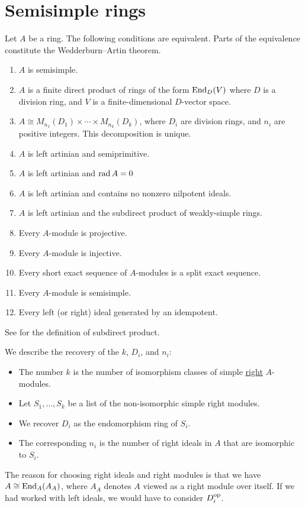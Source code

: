 \documentclass[12pt]{article}
\begin{document}
\section{Semisimple rings}

\begin{thm} \label{thm:semisimple-ring-equivalences}
	Let $A$ be a ring. The following conditions are equivalent. Parts of the equivalence constitute the Wedderburn--Artin theorem.
	\begin{enumerate}[label=(\alph*)]
		\item $A$ is semisimple.
		\item $A$ is a finite direct product of rings of the form $\operatorname{End}_{D}(V)$ where $D$ is a division ring, and $V$ is a finite-dimensional $D$-vector space.
		\item $A \cong M_{n_{1}}(D_{1}) \times \cdots \times M_{n_{k}}(D_{k})$, where $D_{i}$ are division rings, and $n_{i}$ are positive integers. \newline
		This decomposition is unique.
		\item $A$ is left artinian and semiprimitive.
		\item $A$ is left artinian and $\operatorname{rad} A = 0$
		\item $A$ is left artinian and contains no nonzero nilpotent ideals.
		\item $A$ is left artinian and the subdirect product of weakly-simple rings.
		\item Every $A$-module is projective.
		\item Every $A$-module is injective.
		\item Every short exact sequence of $A$-modules is a split exact sequence.
		\item Every $A$-module is semisimple.
		\item Every left (or right) ideal generated by an idempotent.
	\end{enumerate}
\end{thm}
See  for the definition of subdirect product.

\begin{rem}
	We describe the recovery of the $k$, $D_{i}$, and $n_{i}$: 
	\begin{itemize}
		\item The number $k$ is the number of isomorphism classes of simple \underline{right} $A$-modules.
		\item Let $S_{1}, \ldots, S_{k}$ be a list of the non-isomorphic simple right modules.
		\item We recover $D_{i}$ as the endomorphism ring of $S_{i}$.
		\item The corresponding $n_{i}$ is the number of right ideals in $A$ that are isomorphic to $S_{i}$.
	\end{itemize}
	The reason for choosing right ideals and right modules is that 
	we have $A \cong \operatorname{End}_{A}(A_{A})$, where $A_{A}$ denotes $A$ viewed as a right module over itself. \newline
	If we had worked with left ideals, we would have to consider $D_{i}^{\operatorname{op}}$.
\end{rem}
\end{document}
